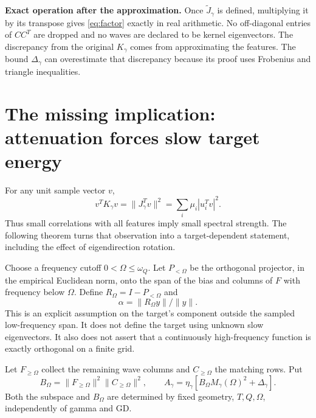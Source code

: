 \documentclass[11pt]{article}
\theoremstyle{definition}
\begin{document}
\textbf{Exact operation after the approximation.} Once $\widetilde J_\gamma$
is defined, multiplying it by its transpose gives \eqref{eq:factor} exactly
in real arithmetic. No off-diagonal entries of $CC^T$ are dropped and no
waves are declared to be kernel eigenvectors. The discrepancy from the
original $K_\gamma$ comes from approximating the features. The bound
$\Delta_\gamma$ can overestimate that discrepancy because its proof uses
Frobenius and triangle inequalities.

\section{The missing implication: attenuation forces slow target energy}
For any unit sample vector $v$,
\begin{equation}\label{eq:rayleigh}
 v^TK_\gamma v=\|J_\gamma^Tv\|^2=\sum_i\mu_i|u_i^Tv|^2.
\end{equation}
Thus small correlations with all features imply small spectral strength. The
following theorem turns that observation into a target-dependent statement,
including the effect of eigendirection rotation.

Choose a frequency cutoff $0<\Omega\le\omega_Q$. Let $P_{<\Omega}$ be the
orthogonal projector, in the empirical Euclidean norm, onto the span of the
bias and columns of $F$ with frequency below $\Omega$. Define
$R_\Omega=I-P_{<\Omega}$ and
\begin{equation*}\alpha=\|R_\Omega y\|/\|y\|.\end{equation*}
This is an explicit assumption on the target's component outside the sampled
low-frequency span. It does not define the target using unknown slow
eigenvectors. It also does not assert that a continuously high-frequency
function is exactly orthogonal on a finite grid.

Let $F_{\ge\Omega}$ collect the remaining wave columns and $C_{\ge\Omega}$
the matching rows. Put
\begin{equation*}
 B_\Omega=\|F_{\ge\Omega}\|^2\|C_{\ge\Omega}\|^2,\qquad
 A_\gamma=\eta_\gamma[B_\Omega M_\gamma(\Omega)^2+\Delta_\gamma].
\end{equation*}
Both the subspace and $B_\Omega$ are determined by fixed geometry,
$T,Q,\Omega$, independently of gamma and GD.
\end{document}
